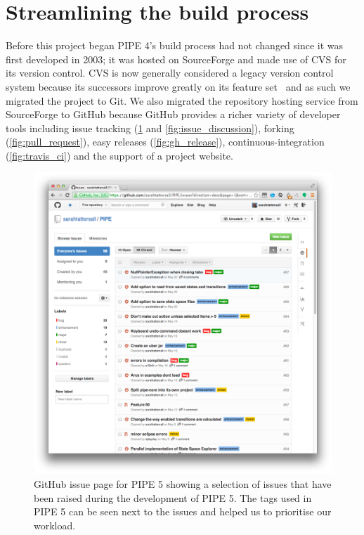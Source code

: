 \section{Streamlining the build process}
Before this project began PIPE 4's build process had not changed since it was first developed in 2003; it was hosted on SourceForge and made use of CVS for its version control. CVS is now generally considered a legacy version control system because its successors improve greatly on its feature set~\cite{so_who_still_uses_cvs} and as such we migrated the project to Git. We also migrated the repository hosting service from SourceForge to GitHub because GitHub provides a richer variety of developer tools including issue tracking (\cref{fig:gh_issues} and \cref{fig:issue_discussion}), forking (\cref{fig:pull_request}), easy releases (\cref{fig:gh_release}), continuous-integration (\cref{fig:travis_ci}) and the support of a project website.

\mediumlinespacing
\begin{figure}[tb]
\begin{center}
    \includegraphics[width=\linewidth]{build/gh_issues.png} 
    \caption{GitHub issue page for PIPE 5 showing a selection of issues that have been raised during the development of PIPE 5. The tags used in PIPE 5 can be seen next to the issues and helped us to prioritise our workload.}
    \label{fig:gh_issues}
\end{center}
\end{figure}

